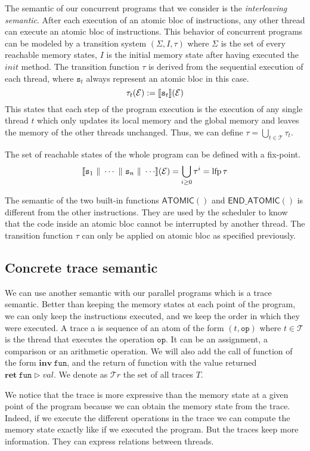 \documentclass{llncs}
\newcommand\srule{\mathtt{s}}
\newcommand{\atomicbegin}{\mathsf{ATOMIC()}}
\newcommand{\atomicend}{\mathsf{END\_ATOMIC()}}
\newcommand{\inv}[1]{\mathbf{inv}\ \mathtt{#1}}
\newcommand{\ret}[2]{\mathbf{ret}\ \mathtt{#1} \vartriangleright #2}
\newcommand{\Thread}{\mathcal T}
\newcommand{\Traces}{\mathcal T\!r}
\newcommand{\parallelcomposition}{\Vert}
\DeclareMathOperator{\lfp}{lfp}
\begin{document}
The semantic of our concurrent programs that we consider is the \emph{interleaving semantic}. After each execution of an atomic bloc of instructions, any other thread can execute an atomic bloc of instructions. This behavior of concurrent programs can be modeled by a transition system $(\Sigma, I, \tau)$ where $\Sigma$ is the set of every reachable memory states, $I$ is the initial memory state after having executed the $init$ method. The transition function $\tau$ is derived from the sequential execution of each thread, where $\srule_t$ always represent an atomic bloc in this case. 
\[\tau_t (\mathcal E) := \exec{\srule_t}(\mathcal E)\]
This states that each step of the program execution is the execution of any single thread  $t$ which only updates its local memory and the global memory and leaves the memory of the other threads unchanged. Thus, we can define $\tau = \bigcup_{t\in\Thread} \tau_t$.

The set of reachable states of the whole program can be defined with a fix-point. 
\[\exec{\srule_1 \ \parallelcomposition \ \cdots \ \parallelcomposition \ \srule_n \ \parallelcomposition \ \cdots}(\mathcal E) = \bigcup_{i \geq 0} \tau^i = \lfp \tau\]


The semantic of the two built-in functions $\atomicbegin$ and $\atomicend$ is different from the other instructions. They are used by the scheduler to know that the code inside an atomic bloc cannot be interrupted by another thread. The transition function $\tau$ can only be applied on atomic bloc as specified previously. 


	\subsection{Concrete trace semantic}
	
We can use another semantic with our parallel programs which is a trace semantic. Better than keeping the memory states at each point of the program, we can only keep the instructions executed, and we keep the order in which they were executed. A trace a is sequence of an atom of the form $(t, \mathtt{op})$ where $t \in \Thread$ is the thread that executes the operation $\mathtt{op}$. It can be an assignment, a comparison or an arithmetic operation. We will also add the call of function of the form $\inv{fun}$, and the return of function with the value returned $\ret{fun}{val}$.
We denote as $\Traces$ the set of all traces $T$. 

We notice that the trace is more expressive than the memory state at a given point of the program because we can obtain the memory state from the trace. Indeed, if we execute the different operations in the trace we can compute the memory state exactly like if we executed the program. But the traces keep more information. They can express relations between threads.
\end{document}
